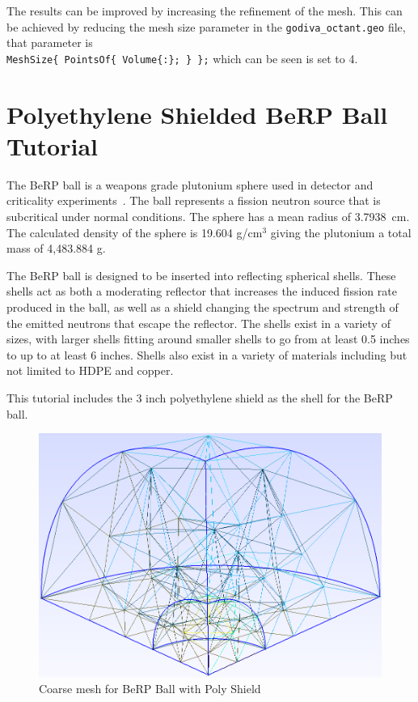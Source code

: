 The results can be improved by increasing the refinement of the mesh.
This can be achieved by reducing the mesh size parameter in the \verb"godiva_octant.geo" file, that parameter is \\
\verb"MeshSize{ PointsOf{ Volume{:}; } };" which can be seen is set to 4.

\section{Polyethylene Shielded BeRP Ball Tutorial}

The BeRP ball is a weapons grade plutonium sphere used in detector and criticality experiments~\cite{BeRP_report}.
The ball represents a fission neutron source that is subcritical under normal conditions.
The sphere has a mean radius of 3.7938~cm.
The calculated density of the sphere is 19.604 g/cm$^3$ giving the plutonium a total mass of 4,483.884 g.

The BeRP ball is designed to be inserted into reflecting spherical shells.
These shells act as both a moderating reflector that increases the induced fission rate produced in the ball, as well as a shield changing the spectrum and strength of the emitted neutrons that escape the reflector.
The shells exist in a variety of sizes, with larger shells fitting around smaller shells to go from at least 0.5 inches to up to at least 6 inches.
Shells also exist in a variety of materials including but not limited to \ac{HDPE} and copper.

This tutorial includes the 3 inch polyethylene shield as the shell for the BeRP ball.

\begin{figure}[th]
  \includegraphics[width=1.0\textwidth]{chapters/tutorials/figures/berp_coarse.png}
  \caption{Coarse mesh for BeRP Ball with Poly Shield}
  \label{fig:berp_coarse}
\end{figure}

